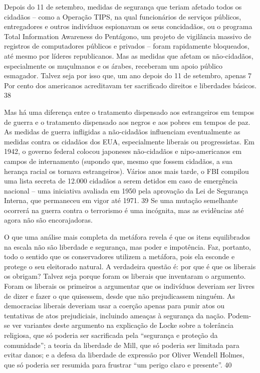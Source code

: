  
\par
 
Depois do 11 de setembro, medidas de segurança que teriam afetado todos os cidadãos – como a Operação TIPS, na qual funcionários de serviços públicos, entregadores e outros indivíduos espionavam os seus concidadãos, ou o programa Total Information Awareness do Pentágono, um projeto de vigilância massivo de registros de computadores públicos e privados – foram rapidamente bloqueados, até mesmo por líderes republicanos. Mas as medidas que afetam os não-cidadãos, especialmente os muçulmanos e os árabes, receberam um apoio público esmagador. Talvez seja por isso que, um ano depois do 11 de setembro, apenas
 {\color{blue} 7}  
Por cento dos americanos acreditavam ter sacrificado direitos e liberdades básicos.
 {\color{blue} 38}  

 
\par
 
Mas há uma diferença entre o tratamento dispensado aos estrangeiros em tempos de guerra e o tratamento dispensado aos negros e aos pobres em tempos de paz. As medidas de guerra infligidas a não-cidadãos influenciam eventualmente as medidas contra os cidadãos dos EUA, especialmente liberais ou progressistas. Em 1942, o governo federal colocou japoneses não-cidadãos e nipo-americanos em campos de internamento (supondo que, mesmo que fossem cidadãos, a sua herança racial os tornava estrangeiros). Vários anos mais tarde, o FBI compilou uma lista secreta de 12.000 cidadãos a serem detidos em caso de emergência nacional – uma iniciativa avaliada em 1950 pela aprovação da Lei de Segurança Interna, que permaneceu em vigor até 1971.
 {\color{blue} 39}  
Se uma mutação semelhante ocorrerá na guerra contra o terrorismo é uma incógnita, mas as evidências até agora não são encorajadoras.
 
\par
 
O que uma análise mais completa da metáfora revela é que os itens equilibrados na escala não são liberdade e segurança, mas poder e impotência. Faz, portanto, todo o sentido que os conservadores utilizem a metáfora, pois ela esconde e protege o seu eleitorado natural. A verdadeira questão é: por que é que os liberais os obrigam? Talvez seja porque foram os liberais que inventaram o argumento. Foram os liberais os primeiros a argumentar que os indivíduos deveriam ser livres de dizer e fazer o que quisessem, desde que não prejudicassem ninguém. As democracias liberais deveriam usar a coerção apenas para punir atos ou tentativas de atos prejudiciais, incluindo ameaças à segurança da nação. Podem-se ver variantes deste argumento na explicação de Locke sobre a tolerância religiosa, que só poderia ser sacrificada pela “segurança e proteção da comunidade”; a teoria da liberdade de Mill, que só poderia ser limitada para evitar danos; e a defesa da liberdade de expressão por Oliver Wendell Holmes, que só poderia ser resumida para frustrar “um perigo claro e presente”.
 {\color{blue} 40}  

